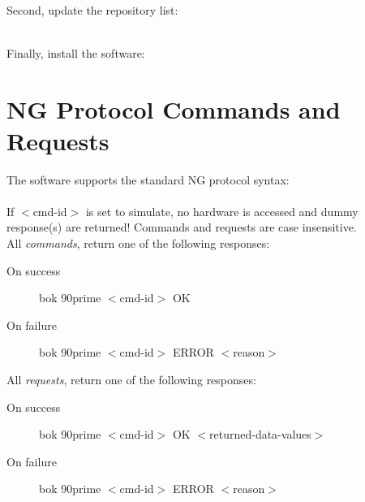 \documentclass[12pt,twoside]{article}
\begin{document}

 \\

\noindent Second, update the repository list: \\


 \\

\noindent Finally, install the software: \\




\newpage
\section{NG Protocol Commands and Requests}
\label{AppendixC}

The software supports the standard NG protocol syntax: \\

 \\

\noindent If $<$cmd-id$>$ is set to {\sc simulate}, no hardware is accessed and dummy response(s) are returned!
Commands and requests are case insensitive. \\

\noindent All \emph{commands}, return one of the following responses:

 \begin{description}
  \item[On success] bok 90prime $<$cmd-id$>$ OK
  \item[On failure] bok 90prime $<$cmd-id$>$ ERROR $<$reason$>$
 \end{description}

\noindent All \emph{requests}, return one of the following responses:

 \begin{description}
  \item[On success] bok 90prime $<$cmd-id$>$ OK $<$returned-data-values$>$
  \item[On failure] bok 90prime $<$cmd-id$>$ ERROR $<$reason$>$
 \end{description}
\end{document}
